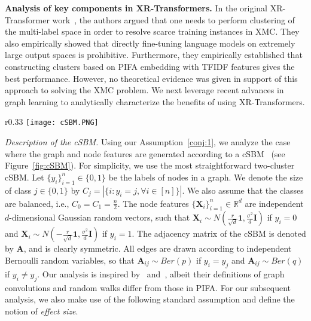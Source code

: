 \documentclass{article} %
\begin{document}
\textbf{Analysis of key components in XR-Transformers.}
In the original XR-Transformer work~\citep{jiong2021fast}, the authors argued that one needs to perform clustering of the multi-label space in order to resolve scarce training instances in XMC. They also empirically showed that directly fine-tuning language models on extremely large output spaces is prohibitive. Furthermore, they empirically established that constructing clusters based on PIFA embedding with TFIDF features gives the best performance. However, no theoretical evidence was given in support of this approach to solving the XMC problem. 
We next leverage recent advances in graph learning to analytically characterize the benefits of using XR-Transformers.

\begin{wrapfigure}{r}{0.33\textwidth}
    \centering
    \vspace{-\intextsep}
    \texttt{[image: cSBM.PNG]}
    \vspace{-0.8cm}
  \caption{Illustration of a cSBM: Node features are independent Gaussian random vectors while edges are modeled as independent Bernoulli random variables.}
  \label{fig:cSBM}
  \vspace{-\intextsep}
\end{wrapfigure}
\textit{Description of the cSBM. }Using our Assumption~\ref{conj:1}, we analyze the case where the graph and node features are generated according to a cSBM~\citep{deshpande2018contextual} (see Figure~\ref{fig:cSBM}). For simplicity, we use the most straightforward two-cluster cSBM. Let $\{y_i\}_{i=1}^n \in \{0,1\}$ be the labels of nodes in a graph. We denote the size of class $j \in \{{0,1\}}$ by $C_j=|\{i:y_i=j,\forall i\in [n]\}|$. We also assume that the classes are balanced, i.e., $C_0=C_1=\frac{n}{2}$. The node features $\{\mathbf{X}_i\}_{i=1}^n\in \mathbb{R}^{d}$ are independent $d$-dimensional Gaussian random vectors, such that $\mathbf{X}_i\sim N(\frac{r}{\sqrt{d}}\mathbf{1},\frac{\sigma^2}{d}\mathbf{I})$ if $y_i = 0$ and $\mathbf{X}_i\sim N(-\frac{r}{\sqrt{d}}\mathbf{1},\frac{\sigma^2}{d}\mathbf{I})$ if $y_i = 1$. The adjacency matrix of the cSBM is denoted by $\mathbf{A}$, and is clearly symmetric. All edges are drawn according to independent Bernoulli random variables, so that $\mathbf{A}_{ij} \sim Ber(p)$ if $y_i=y_j$ and $\mathbf{A}_{ij} \sim Ber(q)$ if $y_i\neq y_j$. Our analysis is inspired by~\cite{baranwal2021graph} and~\cite{li2019optimizing}, albeit their definitions of graph convolutions and random walks differ from those in PIFA. For our subsequent analysis, we also make use of the following standard assumption and define the notion of \emph{effect size}.
\end{document}
